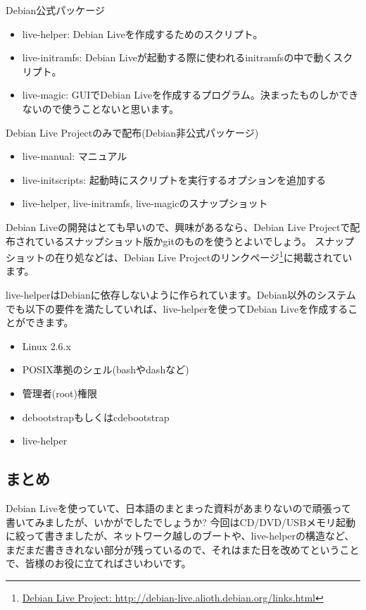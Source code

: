 \documentclass[mingoth,a4paper]{jsarticle}
\begin{document}
Debian公式パッケージ
\begin{itemize}
 \item live-helper: Debian Liveを作成するためのスクリプト。
 \item live-initramfs: Debian Liveが起動する際に使われるinitramfsの中で動くスクリプト。
 \item live-magic: GUIでDebian Liveを作成するプログラム。決まったものしかできないので使うことないと思います。
\end{itemize}

Debian Live Projectのみで配布(Debian非公式パッケージ)
\begin{itemize}
 \item live-manual: マニュアル
 \item live-initscripts: 起動時にスクリプトを実行するオプションを追加する
 \item live-helper, live-initramfs, live-magicのスナップショット
\end{itemize}

Debian Liveの開発はとても早いので、興味があるなら、Debian Live Projectで配布されているスナップショット版かgitのものを使うとよいでしょう。
スナップショットの在り処などは、Debian Live Projectのリンクページ\footnote{\url{Debian Live Project: http://debian-live.alioth.debian.org/links.html}}に掲載されています。

live-helperはDebianに依存しないように作られています。Debian以外のシステムでも以下の要件を満たしていれば、live-helperを使ってDebian Liveを作成することができます。

\begin{itemize}
 \item Linux 2.6.x
 \item POSIX準拠のシェル(bashやdashなど)
 \item 管理者(root)権限
 \item debootstrapもしくはcdebootstrap
 \item live-helper
\end{itemize}

\subsection{まとめ}
Debian Liveを使っていて、日本語のまとまった資料があまりないので頑張って書いてみましたが、いかがでしたでしょうか?
今回はCD/DVD/USBメモリ起動に絞って書きましたが、ネットワーク越しのブートや、live-helperの構造など、まだまだ書ききれない部分が残っているので、それはまた日を改めてということで、皆様のお役に立てればさいわいです。
\end{document}
